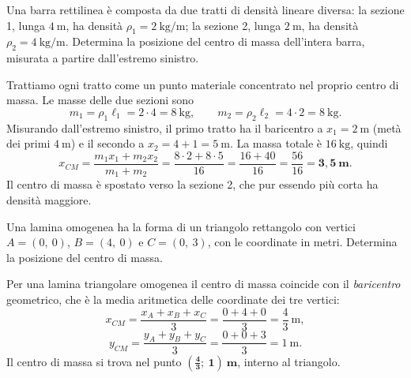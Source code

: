 \begin{question}[ID=1.3, subtitle={Centro di massa di una barra con due sezioni di densità diversa}, tags={corpo rigido, centro di massa}, difficulty=media]
Una barra rettilinea è composta da due tratti di densità lineare diversa: la sezione 1, lunga $4\ \text{m}$, ha densità $\rho_1 = 2\ \text{kg/m}$; la sezione 2, lunga $2\ \text{m}$, ha densità $\rho_2 = 4\ \text{kg/m}$. Determina la posizione del centro di massa dell'intera barra, misurata a partire dall'estremo sinistro.
\begin{solution}
Trattiamo ogni tratto come un punto materiale concentrato nel proprio centro di massa. Le masse delle due sezioni sono
\[
m_1 = \rho_1 \ell_1 = 2\cdot 4 = 8\ \text{kg}, \qquad
m_2 = \rho_2 \ell_2 = 4\cdot 2 = 8\ \text{kg}.
\]
Misurando dall'estremo sinistro, il primo tratto ha il baricentro a $x_1 = 2\ \text{m}$ (metà dei primi $4\ \text{m}$) e il secondo a $x_2 = 4 + 1 = 5\ \text{m}$. La massa totale è $16\ \text{kg}$, quindi
\[
x_{CM} = \frac{m_1 x_1 + m_2 x_2}{m_1 + m_2} = \frac{8\cdot 2 + 8\cdot 5}{16} = \frac{16 + 40}{16} = \frac{56}{16} = \mathbf{3{,}5\ \text{m}}.
\]
Il centro di massa è spostato verso la sezione 2, che pur essendo più corta ha densità maggiore.
\end{solution}
\end{question}


\begin{question}[ID=1.4, subtitle={Centro di massa di un triangolo rettangolo uniforme}, tags={corpo rigido, centro di massa}, difficulty=facile]
Una lamina omogenea ha la forma di un triangolo rettangolo con vertici $A = (0,\ 0)$, $B = (4,\ 0)$ e $C = (0,\ 3)$, con le coordinate in metri. Determina la posizione del centro di massa.
\begin{solution}
Per una lamina triangolare omogenea il centro di massa coincide con il \emph{baricentro} geometrico, che è la media aritmetica delle coordinate dei tre vertici:
\[
x_{CM} = \frac{x_A + x_B + x_C}{3} = \frac{0 + 4 + 0}{3} = \frac{4}{3}\ \text{m},
\]
\[
y_{CM} = \frac{y_A + y_B + y_C}{3} = \frac{0 + 0 + 3}{3} = 1\ \text{m}.
\]
Il centro di massa si trova nel punto $\mathbf{\left(\tfrac{4}{3};\ 1\right)\ \text{m}}$, interno al triangolo.
\end{solution}
\end{question}


